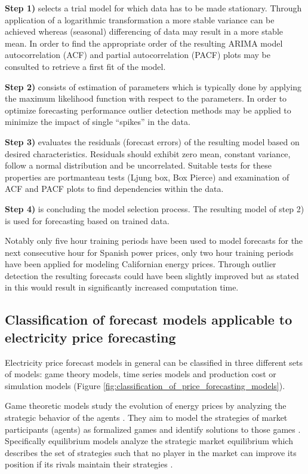 \textbf{Step 1)} selects a trial model for which data has to be made stationary. Through application of a logarithmic transformation a more stable variance can be achieved whereas (seasonal) differencing of data may result in a more stable mean. In order to find the appropriate order of the resulting ARIMA model autocorrelation (ACF) and partial autocorrelation (PACF) plots may be consulted to retrieve a first fit of the model. 

\textbf{Step 2)} consists of estimation of parameters which is typically done by applying the maximum likelihood function with respect to the parameters. In order to optimize forecasting performance outlier detection methods may be applied to minimize the impact of single "`spikes"' in the data. 

\textbf{Step 3)} evaluates the residuals (forecast errors) of the resulting model based on desired characteristics. Residuals should exhibit zero mean, constant variance, follow a normal distribution and be uncorrelated. Suitable tests for these properties are portmanteau tests (Ljung box, Box Pierce) and examination of ACF and PACF plots to find dependencies within the data. 

\textbf{Step 4)} is concluding the model selection process. The resulting model of step 2) is used for forecasting based on trained data. 

Notably only five hour training periods have been used to model forecasts for the next consecutive hour for Spanish power prices, only two hour training periods have been applied for modeling Californian energy prices. 
Through outlier detection the resulting forecasts could have been slightly improved but as stated in \cite{contreras2003arima} this would result in significantly increased computation time. 


\subsection{Classification of forecast models applicable to electricity price forecasting}

Electricity price forecast models in general can be classified in three different sets of models: game theory models, time series models and production cost or simulation models \cite{gonzalez2005modeling, aggarwal2009electricity} (Figure \ref{fig:classification_of_price_forecasting_models}).  

Game theoretic models study the evolution of energy prices by analyzing the strategic behavior of the agents \cite{gonzalez2005modeling}. They aim to model the strategies of market participants (agents) as formalized games and identify solutions to those games \cite{aggarwal2009electricity}. Specifically equilibrium models analyze the strategic market equilibrium which describes the set of strategies such that no player in the market can improve its position if its rivals maintain their strategies \cite{gonzalez2005modeling}. 

